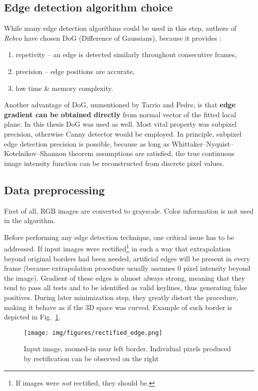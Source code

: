 \subsection{Edge detection algorithm choice}
While many edge detection algorithms could be used in this step, authors of \textit{Rebvo} have chosen DoG (Difference of Gaussians), because it provides \cite{jose2015realtime}:
\begin{enumerate}
	\item repetivity -- an edge is detected similarly throughout consecutive frames,
	\item precision -- edge positions are accurate,
	\item low time \& memory complexity.
\end{enumerate}

Another advantage of DoG, unmentioned by Tarrio and Pedre, is that \textbf{edge gradient can be obtained directly} from normal vector of the fitted local plane. In this thesis DoG was used as well. Most vital property was subpixel precision, otherwise Canny detector \cite{canny} would be employed. In principle, subpixel edge detection precision is possible, because as long as Whittaker–Nyquist–Kotelnikov–Shannon theorem assumptions are satisfied, the true continuous image intensity function can be reconstructed from discrete pixel values.

\subsection{Data preprocessing}

First of all, RGB images are converted to grayscale. Color information is not used in the algorithm.

Before performing any edge detection technique, one critical issue has to be addressed. If input images were rectified\footnote{If images were \textit{not} rectified, they should be.} in such a way that extrapolation beyond original borders had been needed, artificial edges will be present in every frame (because extrapolation procedure usually assumes 0 pixel intensity beyond the image). Gradient of these edges is almost always strong, meaning that they tend to pass all tests and to be identified as valid keylines, thus generating false positives. During later minimization step, they greatly distort the procedure, making it behave as if the 3D space was curved. Example of such border is depicted in Fig.~\ref{fig:rectifcy_border}.

\begin{figure}[ht]
	\centering\texttt{[image: img/figures/rectified\_edge.png]}
	\caption{ Input image, zoomed-in near left border. Individual pixels produced by rectification can be observed on the right }
	\label{fig:rectifcy_border}
\end{figure}

